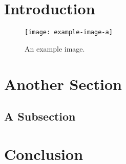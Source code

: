 
\begin{abstract}
    \lipsum[1]
\end{abstract}

\section{Introduction}
\lipsum[2-3]

\begin{figure}
    \centering
    \texttt{[image: example-image-a]}
    \caption{An example image.}
    \label{fig:example}
\end{figure}

\section{Another Section}
\lipsum[4-6]
\subsection{A Subsection}
\lipsum[7-9]

\section{Conclusion}
\lipsum[10-11]

\nocite{*}



